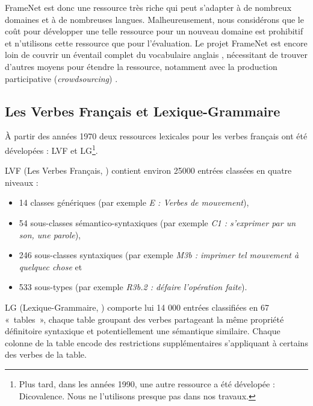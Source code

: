 FrameNet est donc une ressource très riche qui peut s'adapter à de nombreux
domaines et à de nombreuses langues. Malheureusement, nous considérons que le
coût pour développer une telle ressource pour un nouveau domaine est prohibitif
et n'utilisons cette ressource que pour l'évaluation. Le projet FrameNet est
encore loin de couvrir un éventail complet du vocabulaire anglais
\citep[§5.4]{marquez2008semantic}, nécessitant de trouver d'autres moyens pour
étendre la ressource, notamment avec la production participative
(\textit{crowdsourcing}) \citep{fossati2013outsourcing,baker2014framenet}.



\subsection{Les Verbes Français et Lexique-Grammaire}
\label{sec:lvflg}

À partir des années 1970 deux ressources lexicales pour les verbes français ont
été dévelopées : LVF et LG\footnote{Plus tard, dans les années 1990, une autre
    ressource a été dévelopée : Dicovalence. Nous ne l'utilisons presque pas
dans nos travaux.}.

LVF (Les Verbes Français, \cite{dubois1997verbes}) contient environ 25000
entrées classées en quatre niveaux :

\begin{itemize}

    \item 14 classes génériques (par exemple \textit{E : Verbes de mouvement}),

    \item 54 sous-classes sémantico-syntaxiques (par exemple \textit{C1 :
        s'exprimer par un son, une parole}),

    \item 246 sous-classes syntaxiques (par exemple \textit{M3b : imprimer tel
        mouvement à quelquec chose} et

    \item 533 sous-types (par exemple \textit{R3b.2 : défaire l'opération
        faite}).

\end{itemize}


LG (Lexique-Grammaire, \cite{gross1975methodes,boons1976structure}) comporte
lui 14 000 entrées classifiées en 67 «~tables~», chaque table groupant des
verbes partageant la même propriété définitoire syntaxique et potentiellement
une sémantique similaire. Chaque colonne de la table encode des restrictions
supplémentaires s'appliquant à certains des verbes de la table.

